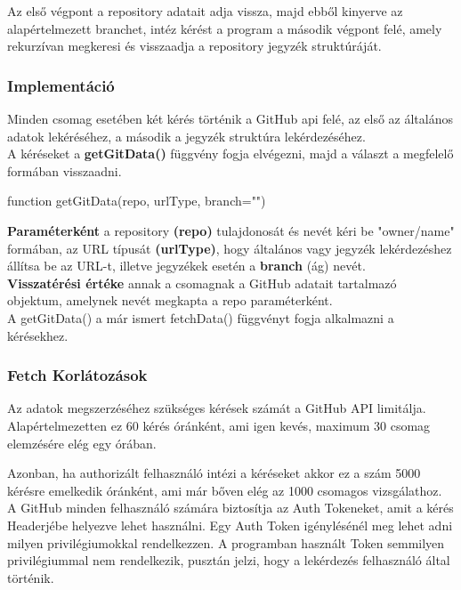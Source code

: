 Az első végpont a repository adatait adja vissza, majd ebből kinyerve az alapértelmezett branchet, intéz kérést a program a második végpont felé, amely rekurzívan megkeresi és visszaadja a repository jegyzék struktúráját.

\subsubsection{Implementáció}
Minden csomag esetében két kérés történik a GitHub api felé, az első az általános adatok lekéréséhez, a második a jegyzék struktúra lekérdezéséhez.\\

A kéréseket a \textbf{getGitData()} függvény fogja elvégezni, majd a választ a megfelelő formában visszaadni.

\begin{js}
function getGitData(repo, urlType, branch="")
\end{js}
\textbf{Paraméterként} a repository \textbf{(repo)} tulajdonosát és nevét kéri be "owner/name" formában, az URL típusát \textbf{(urlType)}, hogy általános vagy jegyzék lekérdezéshez állítsa be az URL-t, illetve jegyzékek esetén a \textbf{branch} (ág) nevét.\\

\noindent\textbf{Visszatérési értéke} annak a csomagnak a GitHub adatait tartalmazó objektum, amelynek nevét megkapta a repo paraméterként.\\

A getGitData() a már ismert fetchData() függvényt fogja alkalmazni a kérésekhez.

\subsubsection{Fetch Korlátozások}
Az adatok megszerzéséhez szükséges kérések számát a GitHub API limitálja. Alapértelmezetten ez 60 kérés óránként, ami igen kevés, maximum 30 csomag elemzésére elég egy órában.

Azonban, ha authorizált felhasználó intézi a kéréseket akkor ez a szám 5000 kérésre emelkedik óránként, ami már bőven elég az 1000 csomagos vizsgálathoz.\\

A GitHub minden felhasználó számára biztosítja az Auth Tokeneket, amit a kérés Headerjébe helyezve lehet használni. Egy Auth Token igénylésénél meg lehet adni milyen privilégiumokkal rendelkezzen. A programban használt Token semmilyen privilégiummal nem rendelkezik, pusztán jelzi, hogy a lekérdezés felhasználó által történik.\\

